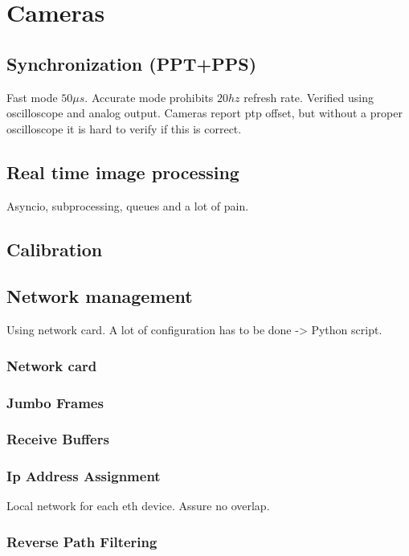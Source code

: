 \chapter{Cameras}



\section{Synchronization (PPT+PPS)}
Fast mode \approx $50\mu s$. Accurate mode prohibits $20hz$ refresh rate.
Verified using oscilloscope and analog output.
Cameras report ptp offset, but without a proper oscilloscope it is hard to verify if this is correct.


\section{Real time image processing}
Asyncio, subprocessing, queues and a lot of pain.



\section{Calibration}


\section{Network management}

Using network card.
A lot of configuration has to be done -> Python script.
\subsection*{Network card}
\subsection*{Jumbo Frames}
\subsection*{Receive Buffers}
\subsection*{Ip Address Assignment}
Local network for each eth device.
Assure no overlap.
\subsection*{Reverse Path Filtering}



